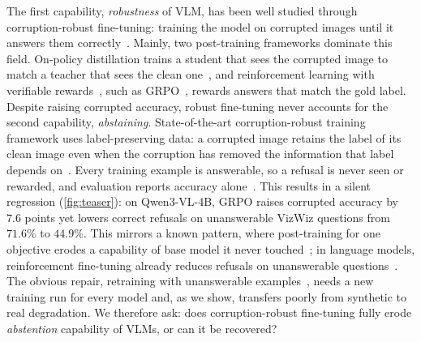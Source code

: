 The first capability, \emph{robustness} of VLM, has been well studied through corruption-robust fine-tuning: training the model on corrupted images until it answers them correctly~\cite{hendrycks2020augmix,wortsman2022wiseft,he2026videoreasoningmodelsready,
tang2026robustr1,liu2026roma}. Mainly, two post-training frameworks dominate this field. On-policy distillation trains a student that sees the corrupted image to match a teacher that sees the clean
one~\cite{hinton2015distilling,kim2016sequence,gu2024minillm,
agarwal2024onpolicydistillationlanguagemodels}, and reinforcement learning with verifiable
rewards~\cite{lambert2024tulu3,guo2025deepseekr1}, such as GRPO~\cite{shao2024deepseekmath,liu2025visualrft}, rewards answers that match the gold label. Despite raising corrupted accuracy, robust fine-tuning never accounts for the second capability, \emph{abstaining}. State-of-the-art corruption-robust training framework uses label-preserving data: a corrupted image retains the label of its clean image even when the corruption has removed the information that label depends on~\cite{hendrycks2020augmix,liu2023softaug}. Every training example is answerable, so a refusal is never seen or rewarded, and evaluation reports accuracy
alone~\cite{usama2025analysing,tang2026robustr1,liu2026roma}. This results in a silent
regression (\cref{fig:teaser}): on Qwen3-VL-4B, GRPO raises corrupted accuracy by $7.6$
points yet lowers correct refusals on unanswerable VizWiz questions from $71.6\%$ to $44.9\%$. This mirrors a known pattern, where post-training for one objective erodes a capability of base model it never touched~\cite{kirkpatrick2017overcoming,kumar2022finetuning,zhai2024forgetting,
qi2024finetuning,luo2023empirical}; in language models, reinforcement fine-tuning already reduces refusals on unanswerable questions~\cite{song2025hallucinationtax,
kirichenko2025abstentionbench}. The obvious repair, retraining with unanswerable
examples~\cite{whitehead2022reliable,zhang2024rtuning}, needs a new training run for every model and, as we show, transfers poorly from synthetic to real degradation. We therefore ask: does corruption-robust fine-tuning fully erode \emph{abstention} capability of VLMs, or can it be recovered?

